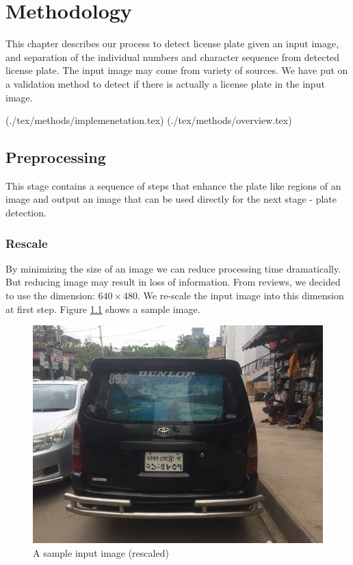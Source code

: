 \documentclass{standalone}
\begin{document}
\chapter{Methodology}
This chapter describes our process to detect license plate given an input image, and separation of the individual numbers and character sequence from detected license plate. The input image may come from variety of sources. We have put on a validation method to detect if there is actually a license plate in the input image.

(./tex/methods/implemenetation.tex)
(./tex/methods/overview.tex)








\section{Preprocessing}
This stage contains a sequence of steps that enhance the plate like regions of an image and output an image that can be used directly for the next stage - plate detection.

\subsection{Rescale}
By minimizing the size of an image we can reduce processing time dramatically. But reducing image may result in loss of information. From reviews, we decided to use the dimension: $640 \times 480$. We re-scale the input image into this dimension at first step. Figure \ref{fig:RescaledSample} shows a sample image.
\begin{figure} 
	\centering
	\includegraphics[width=.8\linewidth]{./img/sample/stage0.jpg}
	\caption{A sample input image (rescaled)}
	\label{fig:RescaledSample}
\end{figure}
\end{document}
